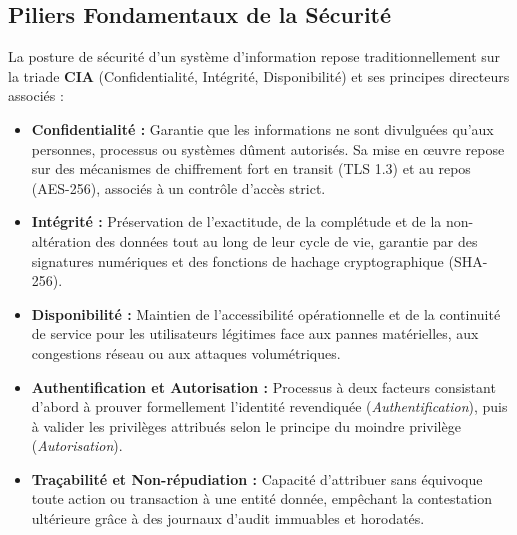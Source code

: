 \subsection{Piliers Fondamentaux de la S\'ecurit\'e}
\par La posture de s\'ecurit\'e d'un syst\`eme d'information repose traditionnellement sur la triade \textbf{CIA} (Confidentialit\'e, Int\'egrit\'e, Disponibilit\'e) et ses principes directeurs associ\'es :
\begin{itemize}
    \item \textbf{Confidentialit\'e :} Garantie que les informations ne sont divulgu\'ees qu'aux personnes, processus ou syst\`emes d\^ument autoris\'es. Sa mise en \oe uvre repose sur des m\'ecanismes de chiffrement fort en transit (TLS 1.3) et au repos (AES-256), associ\'es \`a un contr\^ole d'acc\`es strict.
    \item \textbf{Int\'egrit\'e :} Pr\'eservation de l'exactitude, de la compl\'etude et de la non-alt\'eration des donn\'ees tout au long de leur cycle de vie, garantie par des signatures num\'eriques et des fonctions de hachage cryptographique (SHA-256).
    \item \textbf{Disponibilit\'e :} Maintien de l'accessibilit\'e op\'erationnelle et de la continuit\'e de service pour les utilisateurs l\'egitimes face aux pannes mat\'erielles, aux congestions r\'eseau ou aux attaques volum\'etriques.
    \item \textbf{Authentification et Autorisation :} Processus \`a deux facteurs consistant d'abord \`a prouver formellement l'identit\'e revendiqu\'ee (\textit{Authentification}), puis \`a valider les privil\`eges attribu\'es selon le principe du moindre privil\`ege (\textit{Autorisation}).
    \item \textbf{Tra\c{c}abilit\'e et Non-r\'epudiation :} Capacit\'e d'attribuer sans \'equivoque toute action ou transaction \`a une entit\'e donn\'ee, emp\^echant la contestation ult\'erieure gr\^ace \`a des journaux d'audit immuables et horodat\'es.
\end{itemize}

